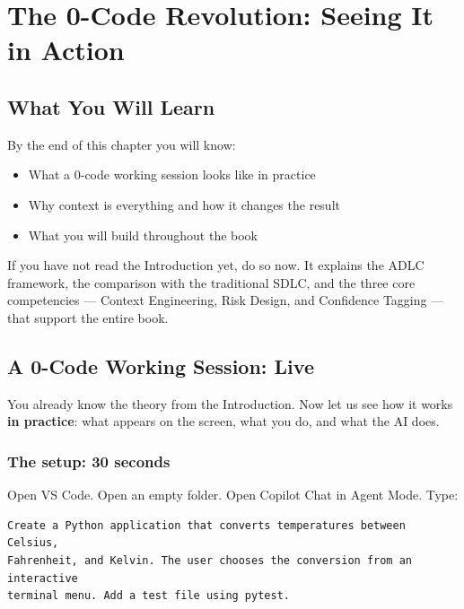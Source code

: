 \chapter{The 0-Code Revolution: Seeing It in Action}

\section*{What You Will Learn}
By the end of this chapter you will know:
\begin{itemize}
  \item What a 0-code working session looks like in practice
  \item Why context is everything and how it changes the result
  \item What you will build throughout the book
\end{itemize}

\begin{notebox}
If you have not read the Introduction yet, do so now. It explains the ADLC framework, the comparison with the traditional SDLC, and the three core competencies --- Context Engineering, Risk Design, and Confidence Tagging --- that support the entire book.
\end{notebox}

\section{A 0-Code Working Session: Live}

You already know the theory from the Introduction. Now let us see how it works \textbf{in practice}: what appears on the screen, what you do, and what the AI does.

\subsection{The setup: 30 seconds}

Open VS Code. Open an empty folder. Open Copilot Chat in Agent Mode. Type:

\begin{lstlisting}[language={}]
Create a Python application that converts temperatures between Celsius,
Fahrenheit, and Kelvin. The user chooses the conversion from an interactive
terminal menu. Add a test file using pytest.
\end{lstlisting}

